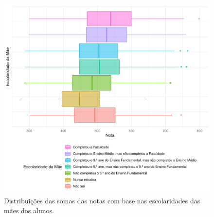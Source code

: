 \newpage
\begin{figure}[h]
    \caption{Distribuições das somas das notas com base nas escolaridades 
    das mães dos alunos.}
    \begin{center}
        \includegraphics[width=16cm]{img/esc_mae_notas.pdf}
    \end{center}
\end{figure}




